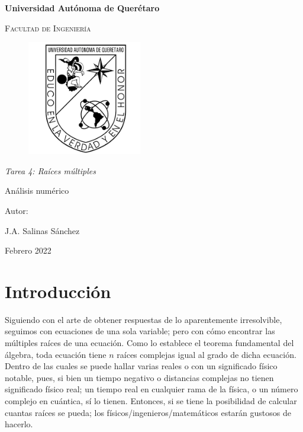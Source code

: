 \documentclass[12pt,oneside,FLEQN]{report}
\begin{document}
{
\selectfont
\begin{titlepage}
        \topmargin=0cm
        \centering

        {\bfseries\LARGE Universidad Autónoma de Querétaro \par}
        \vspace{1cm}
        {\scshape\Large  Facultad de Ingenier\'ia  \par}
        \vspace{2cm}
        \centering
        \begin{figure}[!h]
        \centering
                \includegraphics[height=5cm]{Logouaq.png}
        \end{figure}
        \vspace{3cm}
        {\itshape\large Tarea 4: Raíces múltiples\par}
        \vspace{3cm}
        {\Huge Análisis numérico \par}
        \vspace{2cm}
        {\Large Autor: \par}
        {\large J.A. Salinas Sánchez \par}
        {\large Febrero 2022 \par}
\end{titlepage}
\tableofcontents
\chapter{Introducción}
Siguiendo con el arte de obtener respuestas de lo aparentemente irresolvible, seguimos con ecuaciones de una sola variable; pero con cómo encontrar las múltiples raíces de una ecuación. Como lo establece el teorema fundamental del álgebra, toda ecuación tiene $n$ raíces complejas igual al grado de dicha ecuación. Dentro de las cuales se puede hallar varias reales o con un significado físico notable, pues, si bien un tiempo negativo o distancias complejas no tienen significado físico real; un tiempo real en cualquier rama de la física, o un número complejo en cuántica, sí lo tienen. Entonces, si se tiene la posibilidad de calcular cuantas raíces se pueda; los físicos/ingenieros/matemáticos estarán gustosos de hacerlo.\\

}
\end{document}

